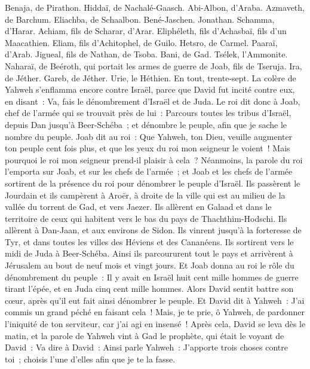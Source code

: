 \begin{multicols}{2}
Benaja, de Pirathon. Hiddaï, de Nachalé-Gaasch.
Abi-Albon, d'Araba. Azmaveth, de Barchum.
Eliachba, de Schaalbon. Bené-Jaschen. Jonathan.
Schamma, d'Harar. Achiam, fils de Scharar, d'Arar.
Eliphéleth, fils d'Achasbaï, fils d'un Maacathien. Eliam, fils d'Achitophel, de Guilo.
Hetsro, de Carmel. Paaraï, d'Arab.
Jigueal, fils de Nathan, de Tsoba. Bani, de Gad.
Tsélek, l'Ammonite. Naharaï, de Beéroth, qui portait les armes de guerre de Joab, fils de Tseruja.
Ira, de Jéther. Gareb, de Jéther.
Urie, le Héthien. En tout, trente-sept.
\VerseOne{}La colère de Yahweh s'enflamma encore contre Israël, parce que David fut incité contre eux, en disant~: Va, fais le dénombrement d'Israël et de Juda.
Le roi dit donc à Joab, chef de l'armée qui se trouvait près de lui~: Parcours toutes les tribus d'Israël, depuis Dan jusqu'à Beer-Schéba~; et dénombre le peuple, afin que je sache le nombre du peuple.
Joab dit au roi~: Que Yahweh, ton Dieu, veuille augmenter ton peuple cent fois plus, et que les yeux du roi mon seigneur le voient~! Mais pourquoi le roi mon seigneur prend-il plaisir à cela~?
Néanmoins, la parole du roi l'emporta sur Joab, et sur les chefs de l'armée~; et Joab et les chefs de l'armée sortirent de la présence du roi pour dénombrer le peuple d'Israël.
Ils passèrent le Jourdain et ils campèrent à Aroër, à droite de la ville qui est au milieu de la vallée du torrent de Gad, et vers Jaezer.
Ils allèrent en Galaad et dans le territoire de ceux qui habitent vers le bas du pays de Thachthim-Hodschi. Ils allèrent à Dan-Jaan, et aux environs de Sidon.
Ils vinrent jusqu'à la forteresse de Tyr, et dans toutes les villes des Héviens et des Cananéens. Ils sortirent vers le midi de Juda à Beer-Schéba.
Ainsi ils parcoururent tout le pays et arrivèrent à Jérusalem au bout de neuf mois et vingt jours.
Et Joab donna au roi le rôle du dénombrement du peuple~: Il y avait en Israël huit cent mille hommes de guerre tirant l'épée, et en Juda cinq cent mille hommes.
Alors David sentit battre son cœur, après qu'il eut fait ainsi dénombrer le peuple. Et David dit à Yahweh~: J'ai commis un grand péché en faisant cela~! Mais, je te prie, ô Yahweh, de pardonner l'iniquité de ton serviteur, car j'ai agi en insensé~!
Après cela, David se leva dès le matin, et la parole de Yahweh vint à Gad le prophète, qui était le voyant de David~:
Va dire à David~: Ainsi parle Yahweh~: J'apporte trois choses contre toi~; choisis l'une d'elles afin que je te la fasse.

\end{multicols}

